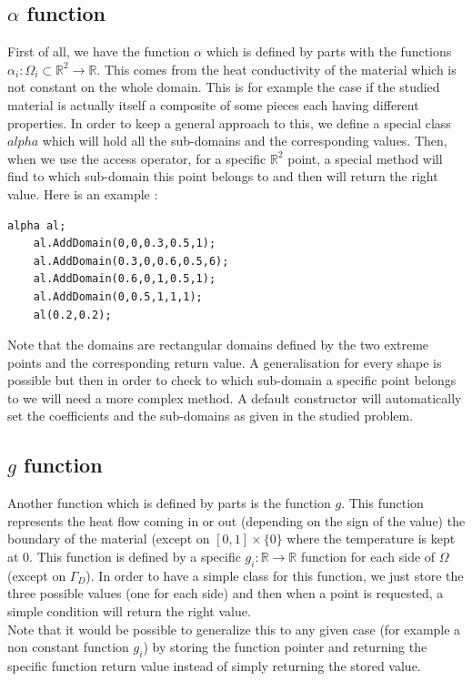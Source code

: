 \documentclass[a4paper]{report}
\begin{document}
\subsection{$\alpha$ function}
First of all, we have the function $\alpha$ which is defined by parts with the functions $\alpha_i : \Omega_i \subset \mathbb{R}^2 \rightarrow \mathbb{R}$. This comes from the heat conductivity of the material which is not constant on the whole domain. This is for example the case if the studied material is actually itself a composite of some pieces each having different properties. In order to keep a general approach to this, we define a special class $alpha$ which will hold all the sub-domains and the corresponding values. Then, when we use the access operator, for a specific $\mathbb{R}^2$ point, a special method will find to which sub-domain this point belongs to and then will return the right value. Here is an example : 
\begin{lstlisting}[basicstyle=\tiny]
    alpha al;
    al.AddDomain(0,0,0.3,0.5,1);
    al.AddDomain(0.3,0,0.6,0.5,6);
    al.AddDomain(0.6,0,1,0.5,1);
    al.AddDomain(0,0.5,1,1,1);
    al(0.2,0.2);
\end{lstlisting}
Note that the domains are rectangular domains defined by the two extreme points and the corresponding return value. A generalisation for every shape is possible but then in order to check to which sub-domain a specific point belongs to we will need a more complex method. A default constructor will automatically set the coefficients and the sub-domains as given in the studied problem.
\subsection{$g$ function}
Another function which is defined by parts is the function $g$. This function represents the heat flow coming in or out (depending on the sign of the value) the boundary of the material (except on $[0,1] \times \{0\}$ where the temperature is kept at $0$. This function is defined by a specific $g_i : \mathbb{R} \rightarrow \mathbb{R}$ function for each side of $\Omega$ (except on $\Gamma_D$). In order to have a simple class for this function, we just store the three possible values (one for each side) and then when a point is requested, a simple condition will return the right value. \\
Note that it would be possible to generalize this to any given case (for example a non constant function $g_i$) by storing the function pointer and returning the specific function return value instead of simply returning the stored value.
\end{document}
